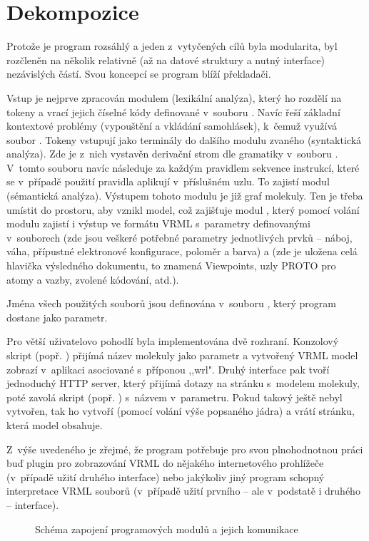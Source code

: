 \chapter{Dekompozice}
Protože je program rozsáhlý a jeden z~vytyčených cílů byla modularita, byl
rozčleněn na několik relativně (až na datové struktury a nutný interface)
nezávislých částí. Svou koncepcí se program blíží překladači.

Vstup je nejprve zpracován modulem  (lexikální analýza), který ho
rozdělí na tokeny a vrací jejich číselné kódy definované v~souboru
. Navíc řeší základní kontextové problémy (vypouštění a vkládání
samohlásek), k~čemuž využívá soubor . Tokeny vstupují jako
terminály do dalšího modulu zvaného  (syntaktická analýza). Zde je
z~nich vystavěn derivační strom dle gramatiky v~souboru .
V~tomto souboru navíc následuje za každým pravidlem sekvence instrukcí, které se
v~případě použití pravidla aplikují v~příslušném uzlu. To zajistí modul
 (sémantická analýza). Výstupem tohoto modulu je již graf
molekuly. Ten je třeba umístit do prostoru, aby vznikl model, což zajišťuje
modul , který pomocí volání modulu  zajistí i výstup
ve for\-má\-tu VRML \cite{Zrzavy:vrml} s~parametry definovanými v~souborech
 (zde jsou veškeré potřebné parametry jednotlivých prvků --
náboj, váha, přípustné elektronové konfigurace, poloměr a barva) a
 (zde je uložena celá hlavička výsledného dokumentu, to
znamená Viewpoints, uzly PROTO pro atomy a vazby, zvolené kódování, atd.).

Jména všech použitých souborů jsou definována v~souboru ,
který program dostane jako parametr.

Pro větší uživatelovo pohodlí byla implementována dvě rozhraní. Konzolový skript
 (popř. ) přijímá název molekuly
jako parametr a vytvořený VRML model zobrazí v~aplikaci asociované s~příponou
,,wrl". Druhý interface pak tvoří jednoduchý HTTP server, který přijímá dotazy
na stránku s~modelem molekuly, poté zavolá skript 
(popř. )
s~názvem v~parametru. Pokud takový ještě nebyl vytvořen, tak ho vytvoří (pomocí
volání výše popsaného jádra) a vrátí stránku, která model obsahuje.

Z~výše uvedeného je zřejmé, že program potřebuje pro svou plnohodnotnou práci
buď plugin pro zobrazování VRML do nějakého internetového prohlížeče (v~případě
užití druhého interface) nebo jakýkoliv jiný program schopný interpretace VRML
souborů (v~případě užití prvního -- ale v~podstatě i druhého -- interface).

\begin{figure}
	\caption{Schéma zapojení programových modulů a jejich komunikace}
\end{figure}
